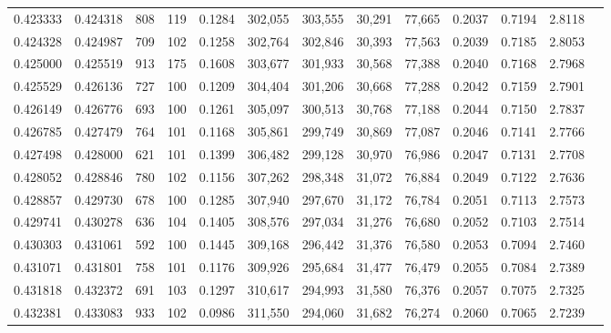 \begin{tabular}{rrrrrrrrrrrrr}
0.423333 & 0.424318 &    808 &   119 &                                     0.1284 & 302,055 & 303,555 &  30,291 &  77,665 & 0.2037 & 0.7194 & 2.8118 \\
0.424328 & 0.424987 &    709 &   102 &                                     0.1258 & 302,764 & 302,846 &  30,393 &  77,563 & 0.2039 & 0.7185 & 2.8053 \\
0.425000 & 0.425519 &    913 &   175 &                                     0.1608 & 303,677 & 301,933 &  30,568 &  77,388 & 0.2040 & 0.7168 & 2.7968 \\
0.425529 & 0.426136 &    727 &   100 &                                     0.1209 & 304,404 & 301,206 &  30,668 &  77,288 & 0.2042 & 0.7159 & 2.7901 \\
0.426149 & 0.426776 &    693 &   100 &                                     0.1261 & 305,097 & 300,513 &  30,768 &  77,188 & 0.2044 & 0.7150 & 2.7837 \\
0.426785 & 0.427479 &    764 &   101 &                                     0.1168 & 305,861 & 299,749 &  30,869 &  77,087 & 0.2046 & 0.7141 & 2.7766 \\
0.427498 & 0.428000 &    621 &   101 &                                     0.1399 & 306,482 & 299,128 &  30,970 &  76,986 & 0.2047 & 0.7131 & 2.7708 \\
0.428052 & 0.428846 &    780 &   102 &                                     0.1156 & 307,262 & 298,348 &  31,072 &  76,884 & 0.2049 & 0.7122 & 2.7636 \\
0.428857 & 0.429730 &    678 &   100 &                                     0.1285 & 307,940 & 297,670 &  31,172 &  76,784 & 0.2051 & 0.7113 & 2.7573 \\
0.429741 & 0.430278 &    636 &   104 &                                     0.1405 & 308,576 & 297,034 &  31,276 &  76,680 & 0.2052 & 0.7103 & 2.7514 \\
0.430303 & 0.431061 &    592 &   100 &                                     0.1445 & 309,168 & 296,442 &  31,376 &  76,580 & 0.2053 & 0.7094 & 2.7460 \\
0.431071 & 0.431801 &    758 &   101 &                                     0.1176 & 309,926 & 295,684 &  31,477 &  76,479 & 0.2055 & 0.7084 & 2.7389 \\
0.431818 & 0.432372 &    691 &   103 &                                     0.1297 & 310,617 & 294,993 &  31,580 &  76,376 & 0.2057 & 0.7075 & 2.7325 \\
0.432381 & 0.433083 &    933 &   102 &                                     0.0986 & 311,550 & 294,060 &  31,682 &  76,274 & 0.2060 & 0.7065 & 2.7239 \\

\end{tabular}
